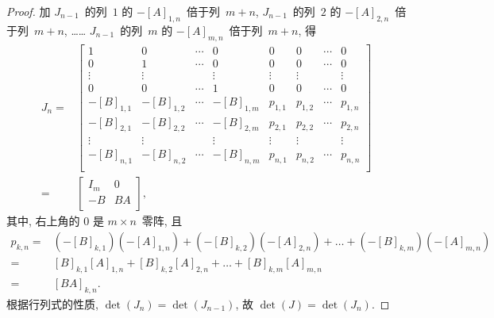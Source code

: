 \documentclass[../libro.tex]{subfiles}
\begin{document}
\begin{proof}
    加
    \(J_{n-1}\)~的列~\(1\) 的 \(-[A]_{1,n}\)~倍于列~\(m+n\),
    \(J_{n-1}\)~的列~\(2\) 的 \(-[A]_{2,n}\)~倍于列~\(m+n\),
    ……
    \(J_{n-1}\)~的列~\(m\) 的 \(-[A]_{m,n}\)~倍于列~\(m+n\),
    得
    \begin{align*}
        J_n
        = {} &
        \begin{bmatrix}
            1          & 0          & \cdots & 0          &
            0          & 0          & \cdots & 0            \\
            0          & 1          & \cdots & 0          &
            0          & 0          & \cdots & 0            \\
            \vdots     & \vdots     & {}     & \vdots     &
            \vdots     & \vdots     & {}     & \vdots       \\
            0          & 0          & \cdots & 1          &
            0          & 0          & \cdots & 0            \\
            -[B]_{1,1} & -[B]_{1,2} & \cdots & -[B]_{1,m} &
            p_{1,1}    & p_{1,2}    & \cdots & p_{1,n}      \\
            -[B]_{2,1} & -[B]_{2,2} & \cdots & -[B]_{2,m} &
            p_{2,1}    & p_{2,2}    & \cdots & p_{2,n}      \\
            \vdots     & \vdots     & {}     & \vdots     &
            \vdots     & \vdots     & {}     & \vdots       \\
            -[B]_{n,1} & -[B]_{n,2} & \cdots & -[B]_{n,m} &
            p_{n,1}    & p_{n,2}    & \cdots & p_{n,n}      \\
        \end{bmatrix}
        \\
        = {} &
        \begin{bmatrix}
            I_m & 0  \\
            -B  & BA \\
        \end{bmatrix},
    \end{align*}
    其中, 右上角的 \(0\) 是 \(m \times n\)~零阵,
    且
    \begin{align*}
        p_{k,n}
        = {} &
        (-[B]_{k,1})(-[A]_{1,n})
        + (-[B]_{k,2})(-[A]_{2,n})
        + \dots
        + (-[B]_{k,m})(-[A]_{m,n})
        \\
        = {} &
        [B]_{k,1} [A]_{1,n}
        + [B]_{k,2} [A]_{2,n}
        + \dots
        + [B]_{k,m} [A]_{m,n}
        \\
        = {} &
        [BA]_{k,n}.
    \end{align*}
    根据行列式的性质,
    \(\det {(J_n)} = \det {(J_{n-1})}\),
    故
    \(\det {(J)} = \det {(J_n)}\).


\end{proof}
\end{document}
